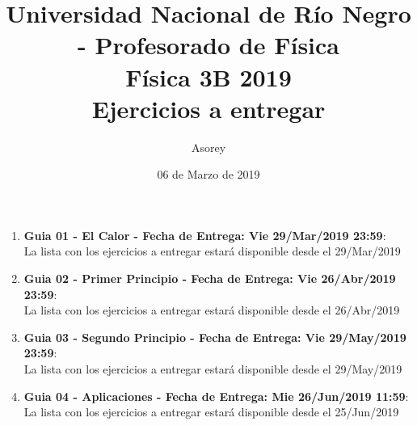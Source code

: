 \documentclass[a4paper,12pt]{article}
\begin{document}
\title{
{\normalsize{Universidad Nacional de Río Negro - Profesorado de Física}}\\
Física 3B 2019\\ Ejercicios a entregar}
\author{Asorey}
\date{06 de Marzo de 2019}
\maketitle

\begin{enumerate}
	\item {\bf{Guia 01 - El Calor - Fecha de Entrega: Vie 29/Mar/2019 23:59}}:\\
		La lista con los ejercicios a entregar estará disponible desde el 29/Mar/2019
	\item {\bf{Guia 02 - Primer Principio - Fecha de Entrega: Vie 26/Abr/2019 23:59}}:\\		
		La lista con los ejercicios a entregar estará disponible desde el 26/Abr/2019
	\item {\bf{Guia 03 - Segundo Principio - Fecha de Entrega: Vie 29/May/2019 23:59}}:\\		
		La lista con los ejercicios a entregar estará disponible desde el 29/May/2019
	\item {\bf{Guia 04 - Aplicaciones - Fecha de Entrega: Mie 26/Jun/2019 11:59}}:\\		
		La lista con los ejercicios a entregar estará disponible desde el 25/Jun/2019
\end{enumerate}
\end{document}
